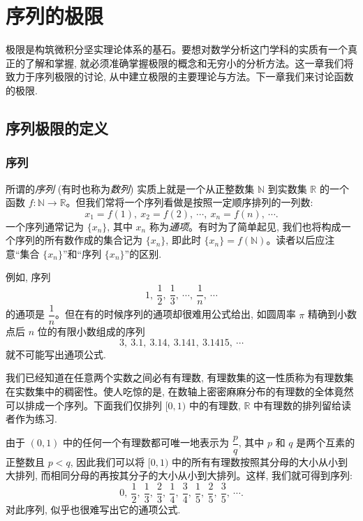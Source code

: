 \setcounter{chapter}{1} %
\chapter{序列的极限}
\label{chap:ma-2}

极限是构筑微积分坚实理论体系的基石。要想对数学分析这门学科的实质有一个真正的了解和掌握, 就必须准确掌握极限的概念和无穷小的分析方法。这一章我们将致力于序列极限的讨论, 从中建立极限的主要理论与方法。下一章我们来讨论函数的极限.

\section{序列极限的定义}
\label{sec:ma-2-1}

\subsection{序列}
\label{subsec:ma-2-1-1}

所谓的\emph{序列} (有时也称为\emph{数列}) 实质上就是一个从正整数集 $\mathbb{N}$ 到实数集 $\mathbb{R}$ 的一个函数 $f:\mathbb{N}\to\mathbb{R}$。但我们常将一个序列看做是按照一定顺序排列的一列数:
\[
  x_1=f(1),\ x_2=f(2),\ \cdots,\ x_n=f(n),\ \cdots .
\]
一个序列通常记为 $\{x_n\}$, 其中 $x_n$ 称为\emph{通项}。有时为了简单起见, 我们也将构成一个序列的所有数作成的集合记为 $\{x_n\}$, 即此时 $\{x_n\}=f(\mathbb{N})$。读者以后应注意``集合 $\{x_n\}$''和``序列 $\{x_n\}$''的区别.

例如, 序列
\[
  1,\ \frac12,\ \frac13,\ \cdots,\ \frac1n,\ \cdots
\]
的通项是 $\dfrac1n$。但在有的时候序列的通项却很难用公式给出, 如圆周率 $\pi$ 精确到小数点后 $n$ 位的有限小数组成的序列
\[
  3,\ 3.1,\ 3.14,\ 3.141,\ 3.1415,\ \cdots
\]
就不可能写出通项公式.

我们已经知道在任意两个实数之间必有有理数, 有理数集的这一性质称为有理数集在实数集中的稠密性。使人吃惊的是, 在数轴上密密麻麻分布的有理数的全体竟然可以排成一个序列。下面我们仅排列 $[0,1)$ 中的有理数, $\mathbb{R}$ 中有理数的排列留给读者作为练习.

由于 $(0,1)$ 中的任何一个有理数都可唯一地表示为 $\dfrac pq$, 其中 $p$ 和 $q$ 是两个互素的正整数且 $p<q$, 因此我们可以将 $[0,1)$ 中的所有有理数按照其分母的大小从小到大排列, 而相同分母的再按其分子的大小从小到大排列。这样, 我们就可得到序列:
\[
  0,\ \frac12,\ \frac13,\ \frac23,\ \frac14,\ \frac34,\ \frac15,\ \frac25,\ \frac35,\ \cdots .
\]
对此序列, 似乎也很难写出它的通项公式.


